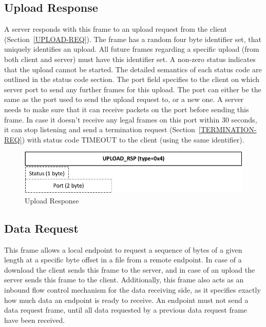 \documentclass[]{article}
\begin{document}
\subsection{Upload Response}

A server responds with this frame to an upload request from the
client (Section~\ref{UPLOAD-REQ}). The frame has a random four 
byte identifier set, that uniquely identifies an upload. All
future frames regarding a specific upload (from both client and server)
must have this identifier set. A non-zero status indicates that the
upload cannot be started. The detailed semantics of each status code are outlined
in the status code section. The port field specifies to the client
on which server port to send any further frames for this upload.
The port can either be the same as the port used to send the
upload request to, or a new one. A server needs to make sure
that it can receive packets on the port before sending this frame. 
In case it doesn't receive any legal frames on this port within 30
seconds, it can stop listening and send a termination request (Section~\ref{TERMINATION-REQ})
with status code TIMEOUT to the client (using the same identifier).

\begin{figure}[H]
\centering
\includegraphics[width=\textwidth]{frames/upload-rsp.pdf}
\caption{Upload Response}
\label{UPLOAD-RSP}
\end{figure}

\subsection{Data Request}

This frame allows a local endpoint to request a sequence of bytes of
a given length at a specific byte offset in a file from a remote endpoint.
In case of a download the client sends this frame to the server, 
and in case of an upload the server sends this
frame to the client. Additionally, this frame also acts as an inbound
flow control mechanism for the data receiving side, as it specifies
exactly how much data an endpoint is ready to receive. An endpoint
must not send a data request frame, until all data requested by a 
previous data request frame have been received. 
\end{document}
